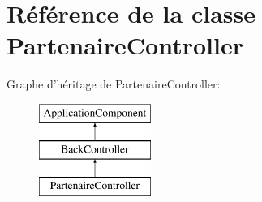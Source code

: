 \hypertarget{class_applications_1_1_backend_1_1_modules_1_1_partenaire_1_1_partenaire_controller}{\section{Référence de la classe Partenaire\+Controller}
\label{class_applications_1_1_backend_1_1_modules_1_1_partenaire_1_1_partenaire_controller}
}
Graphe d'héritage de Partenaire\+Controller\+:\begin{figure}[H]
\begin{center}
\leavevmode
\includegraphics[height=3.000000cm]{class_applications_1_1_backend_1_1_modules_1_1_partenaire_1_1_partenaire_controller}
\end{center}
\end{figure}
